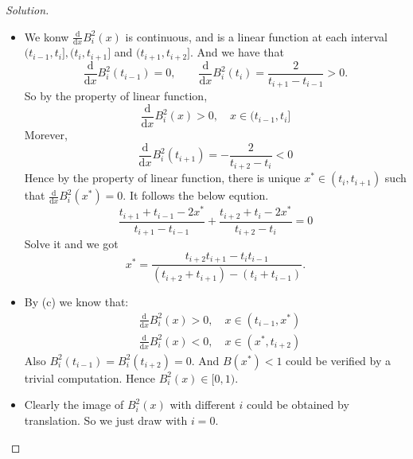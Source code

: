\documentclass[a4paper]{ctexart}
\begin{document}
\begin{proof}[Solution]
\begin{itemize}
		\item We konw $\frac{\text{d}}{\text{d}x}B_i^2(x)$ is continuous, and is a linear function at each interval $(t_{i-1},t_i],(t_{i},t_{i+1}]$ and $(t_{i+1},t_{i+2}]$. And we have that
		      $$
			      \frac{\text{d}}{\text{d}x}B_i^2(t_{i-1})=0,\qquad \frac{\text{d}}{\text{d}x}B_i^2(t_i)=\frac{2}{t_{i+1}-t_{i-1}}>0.
		      $$
		      So by the property of linear function,
		      $$
			      \frac{\text{d}}{\text{d}x}B_i^2(x)>0, \quad x\in(t_{i-1},t_i]
		      $$
		      Morever,
		      $$
			      \frac{\text{d}}{\text{d}x}B_i^2(t_{i+1})=-\frac{2}{t_{i+2}-t_i}<0
		      $$
		      Hence by the property of linear function, there is unique $x^*\in(t_{i},t_{i+1})$ such that $\frac{\text{d}}{\text{d}x}B_i^2(x^*)=0$. It follows the below eqution.
		      $$
			      \frac{t_{i+1}+t_{i-1}-2x^*}{t_{i+1}-t_{i-1}}+\frac{t_{i+2}+t_i-2x^*}{t_{i+2}-t_i}=0
		      $$
		      Solve it and we got
		      $$
			      x^*=\frac{t_{i+2}t_{i+1}-t_it_{i-1}}{(t_{i+2}+t_{i+1})-(t_i+t_{i-1})}.
		      $$

		\item By (c) we know that:
		      \begin{align*}
			       & \frac{\text{d}}{\text{d}x}B_i^2(x)>0, \quad x\in(t_{i-1},x^*) \\
			       & \frac{\text{d}}{\text{d}x}B_i^2(x)<0, \quad x\in(x^*,t_{i+2})
		      \end{align*}
		      Also $B_i^2(t_{i-1})=B_i^2(t_{i+2})=0$. And $B(x^*)<1$ could be verified by a trivial computation. Hence $B_i^2(x)\in[0,1)$.

		\item Clearly the image of $B_i^2(x)$ with different $i$ could be obtained by translation. So we just draw with $i=0$.
		      \begin{center}
		      \end{center}
	\end{itemize}
\end{proof}
\end{document}

